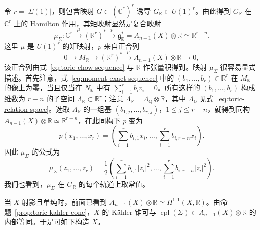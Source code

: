令 $r=|\Sigma(1)|$，则包含映射 $G\subset(\mathbb C^*)^r$ 诱导 $G_{\mathbb R}\subset U(1)^r$。由此得到 $G_{\mathbb R}$ 在 $\mathbb C^r$ 上的 Hamilton 作用，其矩映射显然是复合映射
\[
\mu_\Sigma:\mathbb C^r\xrightarrow{\mu}(\mathbb R^r)^*
\xrightarrow{p}\mathfrak g_{\mathbb R}^*
=A_{n-1}(X)\otimes\mathbb R\simeq\mathbb R^{r-n}.
\]
这里 $\mu$ 是 $U(1)^r$ 的矩映射，$p$ 来自正合列
\begin{equation}\label{eq:moment-exact-sequence}
0\longrightarrow M_{\mathbb R}\longrightarrow(\mathbb R^r)^*
\xrightarrow{p}A_{n-1}(X)\otimes\mathbb R\longrightarrow0,
\end{equation}
该正合列由式~\eqref{eq:toric-chow-sequence} 与 $\mathbb R$ 作张量积得到。映射 $\mu_\Sigma$ 很容易显式描述。首先注意，式~\eqref{eq:moment-exact-sequence} 中的 $(b_1,\ldots,b_r)\in\mathbb R^r$ 在 $M_{\mathbb R}$ 的像上为零，当且仅当在 $N_{\mathbb R}$ 中有 $\sum_{i=1}^r b_iv_i=0$。所有这样的 $(b_1,\ldots,b_r)$ 构成维数为 $r-n$ 的子空间 $\Lambda_{\mathbb R}\subset\mathbb R^r$；注意 $\Lambda_{\mathbb R}=\Lambda_{\mathbb Q}\otimes\mathbb R$，其中 $\Lambda_{\mathbb Q}$ 见式~\eqref{eq:toric-relation-space}。选取 $\Lambda_{\mathbb R}$ 的一组基 $(b_{1,j},\ldots,b_{r,j})$，$1\leq j\leq r-n$，就得到同构 $A_{n-1}(X)\otimes\mathbb R\simeq\mathbb R^{r-n}$，在此同构下 $p$ 变为
\[
p(x_1,\ldots,x_r)=
\left(\sum_{i=1}^r b_{i,1}x_i,\ldots,\sum_{i=1}^r b_{i,r-n}x_i\right).
\]
因此 $\mu_\Sigma$ 的公式为
\begin{equation}\label{eq:toric-moment-map}
\mu_\Sigma(z_1,\ldots,z_r)=\frac12
\left(\sum_{i=1}^r b_{i,1}|z_i|^2,\ldots,
\sum_{i=1}^r b_{i,r-n}|z_i|^2\right).
\end{equation}
我们也看到，$\mu_\Sigma$ 在 $G_{\mathbb R}$ 的每个轨道上取常值。

当 $X$ 射影且单纯时，前面已看到 $A_{n-1}(X)\otimes\mathbb R\simeq H^{1,1}(X,\mathbb R)$。由命题~\ref{prop:toric-kahler-cone}，$X$ 的 Kähler 锥可与 $\operatorname{cpl}(\Sigma)\subset A_{n-1}(X)\otimes\mathbb R$ 的内部等同。于是可如下构造 $X$。

